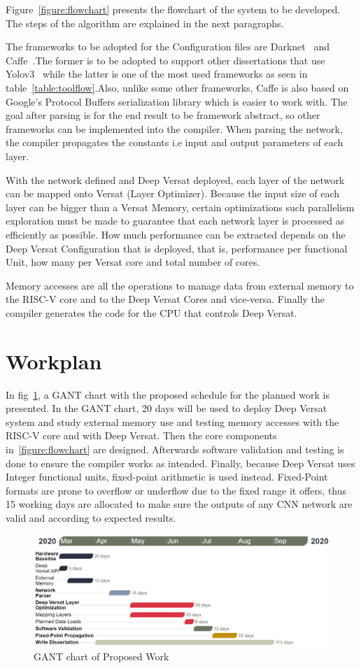 Figure~\ref{figure:flowchart} presents the flowchart of the system to be developed. The steps
of the algorithm are explained in the next paragraphs.


The frameworks to be adopted for the Configuration files are Darknet~\cite{darknet} and Caffe~\cite{caffe}.The former is to be adopted
to support other dissertations that use Yolov3~\cite{yolov3} while the latter is one of the most used frameworks as seen in table~\ref{table:toolflow}.Also,
unlike some other frameworks, Caffe is also based on Google's Protocol Buffers serialization library which is easier to work with.
The goal after parsing is for the end result to be framework abstract, so other frameworks can be implemented into the compiler.
When parsing the network, the compiler propagates the constants i.e input and output parameters of each layer.

With the network defined and Deep Versat deployed, each layer of the network can be mapped onto Versat (Layer Optimizer). Because the input size of each layer
can be bigger than a Versat Memory, certain optimizations such parallelism exploration must be made to guarantee that each network layer is processed as efficiently as possible. 
How much performance can be extracted depends on the Deep Versat Configuration that is deployed, that is, performance per functional Unit, how many per Versat core and
total number of cores.

Memory accesses are all the operations to manage data from external memory to the RISC-V core and to the Deep Versat Cores and vice-versa.
Finally the compiler generates the code for the CPU that controls Deep Versat.

\section{Workplan}

In fig~\ref{figure:gant}, a GANT chart with the proposed schedule for the
planned work is presented. In the GANT chart, 20 days will be used to deploy Deep Versat system and study external memory use and testing
memory accesses with the RISC-V core and with Deep Versat. Then the core components in~\ref{figure:flowchart} are designed. Afterwards
software validation and testing is done to ensure the compiler works as intended. Finally, because Deep Versat uses Integer functional units, fixed-point arithmetic
is used instead. Fixed-Point formats are prone to overflow or underflow due to the fixed range it offers, thus 15 working days are allocated to
make sure the outputs of any CNN network are valid and according to expected results. 

\begin{figure}[!htpb]
    \includegraphics[width=1\textwidth]{Figures/gant2.png}
    \caption{GANT chart of Proposed Work}
    \label{figure:gant}
\end{figure}





